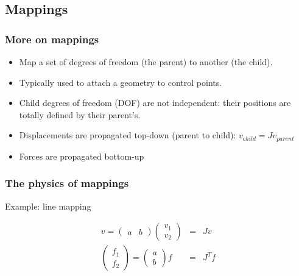 \documentclass[a4paper,compress]{beamer}
\begin{document}
\subsection{Mappings}

\begin{frame}
\frametitle{More on mappings}
\begin{itemize}
 \item Map a set of degrees of freedom (the parent) to another (the child).
 \item Typically used to attach a geometry to control points.
 \item Child degrees of freedom (DOF) are not independent: their positions are totally defined by their parent's.
 \item Displacements are propagated top-down (parent to child): $v_{child} = Jv_{parent}$
 \item Forces are propagated bottom-up
\end{itemize}

\end{frame}


\begin{frame}
\frametitle{The physics of mappings}
Example: line mapping


$$
\begin{array}{rcl}
v = \left(
\begin{array}{cc}
a & b
\end{array}
\right)
\left(
\begin{array}{c}
v_1 \\ 
v_2
\end{array}
\right)
&=& J v
 \\
\left(\begin{array}{c}
f_1 \\ f_2
\end{array}
\right)
= 
\left(\begin{array}{c}
a \\ 
b
\end{array}
\right)
f
&=& J^T f
\end{array}
$$
\end{frame}
\end{document}
